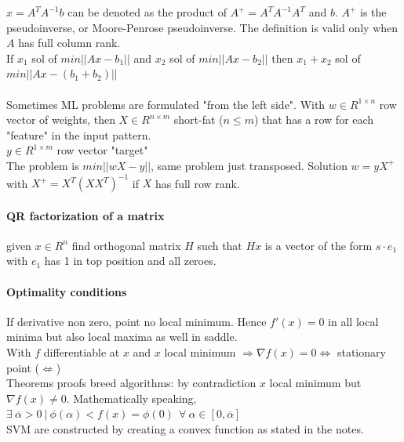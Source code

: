 \documentclass[10pt]{report}
\begin{document}
$x = A^TA^{-1}b$ can be denoted as the product of $A^+ = A^TA^{-1}A^T$ and $b$. $A^+$ is the pseudoinverse, or Moore-Penrose pseudoinverse. The definition is valid only when $A$ has full column rank.\\
If $x_1$ sol of $min||Ax - b_1||$ and $x_2$ sol of $min||Ax - b_2||$ then $x_1+x_2$ sol of $min||Ax - (b_1 + b_2)||$\\\\Sometimes ML problems are formulated "from the left side". With $w\in R^{1\times n}$ row vector of weights, then $X\in R^{n\times m}$ short-fat ($n\leq m$) that has a row for each "feature" in the input pattern.\\
$y \in R^{1\times m}$ row vector "target"\\
The problem is $min||wX - y||$, same problem just transposed. Solution $w = yX^+$ with $X^+ = X^T(XX^T)^{-1}$ if $X$ has full row rank.
\paragraph{QR factorization of a matrix} given $x\in R^n$ find orthogonal matrix $H$ such that $Hx$ is a vector of the form $s\cdot e_1$ with $e_1$ has 1 in top position and all zeroes.
\paragraph{Optimality conditions} If derivative non zero, point no local minimum. Hence $f'(x)=0$ in all local minima but also local maxima as well in saddle.\\
With $f$ differentiable at $x$ and $x$ local minimum $\Rightarrow \nabla f(x) = 0 \Leftrightarrow$ stationary point ($\not\Leftarrow$)\\
Theorems proofs breed algorithms: by contradiction $x$ local minimum but $\nabla f(x)\neq 0$. Mathematically speaking, $\exists\:\overline{\alpha} > 0\:|\:\phi(\alpha) < f(x) = \phi(0)\:\:\forall\:\alpha\in[0, \overline{\alpha}]$\\
SVM are constructed by creating a convex function as stated in the notes.
\end{document}
